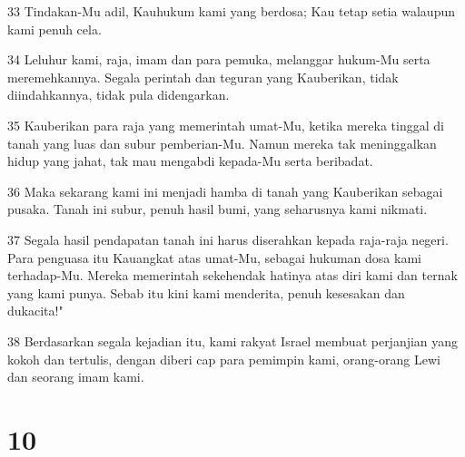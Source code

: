 \par 33 Tindakan-Mu adil, Kauhukum kami yang berdosa; Kau tetap setia walaupun kami penuh cela.
\par 34 Leluhur kami, raja, imam dan para pemuka, melanggar hukum-Mu serta meremehkannya. Segala perintah dan teguran yang Kauberikan, tidak diindahkannya, tidak pula didengarkan.
\par 35 Kauberikan para raja yang memerintah umat-Mu, ketika mereka tinggal di tanah yang luas dan subur pemberian-Mu. Namun mereka tak meninggalkan hidup yang jahat, tak mau mengabdi kepada-Mu serta beribadat.
\par 36 Maka sekarang kami ini menjadi hamba di tanah yang Kauberikan sebagai pusaka. Tanah ini subur, penuh hasil bumi, yang seharusnya kami nikmati.
\par 37 Segala hasil pendapatan tanah ini harus diserahkan kepada raja-raja negeri. Para penguasa itu Kauangkat atas umat-Mu, sebagai hukuman dosa kami terhadap-Mu. Mereka memerintah sekehendak hatinya atas diri kami dan ternak yang kami punya. Sebab itu kini kami menderita, penuh kesesakan dan dukacita!"
\par 38 Berdasarkan segala kejadian itu, kami rakyat Israel membuat perjanjian yang kokoh dan tertulis, dengan diberi cap para pemimpin kami, orang-orang Lewi dan seorang imam kami.

\chapter{10}

